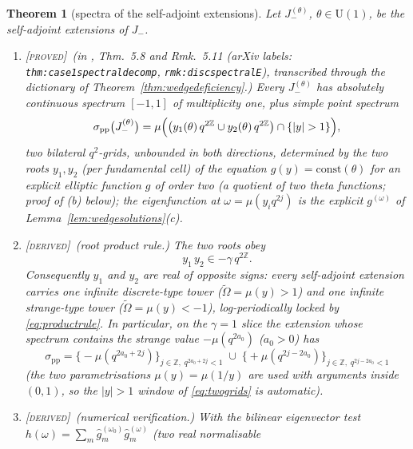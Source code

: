 \documentclass[11pt,a4paper]{article}
\newcommand{\PROVED}{{\color{ForestGreen}\textsc{[proved]}}}
\newcommand{\DERIVED}{{\color{teal}\textsc{[derived]}}}
\theoremstyle{definition}
\theoremstyle{plain}
\newtheorem{theorem}[definition]{Theorem}
\newcommand{\tCas}{\tilde\Omega}                %
\newcommand{\Z}{\mathbb{Z}}
\begin{document}
\begin{theorem}[spectra of the self-adjoint extensions]\label{thm:wedgespectra}
Let $J^{(\theta)}_{-}$, $\theta\in\mathrm{U}(1)$, be the self-adjoint extensions of $J_{-}$.
\begin{enumerate}[label=(\alph*)]
\item \PROVED\ (in \cite{Koelink:2003oneparam}, Thm.\ 5.8 and Rmk.\ 5.11
(arXiv labels: \texttt{thm:case1spectraldecomp}, \texttt{rmk:discspectralE}), transcribed
through the dictionary of Theorem~\ref{thm:wedgedeficiency}.) Every $J^{(\theta)}_{-}$ has
absolutely continuous spectrum $[-1,1]$ of multiplicity one, plus simple point spectrum
\begin{equation}\label{eq:twogrids}
  \sigma_{\mathrm{pp}}\bigl(J^{(\theta)}_{-}\bigr)
  =\mu\Bigl(\bigl(y_{1}(\theta)\,q^{2\Z}\cup y_{2}(\theta)\,q^{2\Z}\bigr)
  \cap\{|y|>1\}\Bigr),
\end{equation}
\emph{two bilateral $q^{2}$-grids}, unbounded in both directions, determined by the two
roots $y_{1},y_{2}$ (per fundamental cell) of the equation $g(y)=\mathrm{const}(\theta)$
for an explicit elliptic function $g$ of order two (a quotient of two theta functions;
proof of (b) below); the eigenfunction at
$\omega=\mu(y_{i}q^{2j})$ is the explicit $g^{(\omega)}$ of
Lemma~\ref{lem:wedgesolutions}(c).
\item \DERIVED\ \emph{(root product rule.)} The two roots obey
\begin{equation}\label{eq:productrule}
  y_{1}\,y_{2}\in-\gamma\,q^{2\Z} .
\end{equation}
Consequently $y_{1}$ and $y_{2}$ are real of \emph{opposite signs}: every self-adjoint
extension carries one infinite \emph{discrete-type} tower ($\tCas=\mu(y)>1$) and one
infinite \emph{strange-type} tower ($\tCas=\mu(y)<-1$), log-periodically locked by
\eqref{eq:productrule}. In particular, on the $\gamma=1$ slice the extension whose spectrum
contains the strange value $-\mu(q^{2a_{0}})$ ($a_{0}>0$) has
\begin{equation}\label{eq:extensionspectrum}
  \sigma_{\mathrm{pp}}=\bigl\{-\mu(q^{2a_{0}+2j})\bigr\}_{j\in\Z,\;q^{2a_{0}+2j}<1}
  \;\cup\;\bigl\{+\mu(q^{2j-2a_{0}})\bigr\}_{j\in\Z,\;q^{2j-2a_{0}}<1}
\end{equation}
(the two parametrisations $\mu(y)=\mu(1/y)$ are used with arguments inside $(0,1)$, so the
$|y|>1$ window of \eqref{eq:twogrids} is automatic).
\item \DERIVED\ \emph{(numerical verification.)} With the bilinear eigenvector test
$h(\omega)=\sum_{m}\hat g^{(\omega_{0})}_{m}\hat g^{(\omega)}_{m}$ (two real normalisable

\end{enumerate}
\end{theorem}
\end{document}
